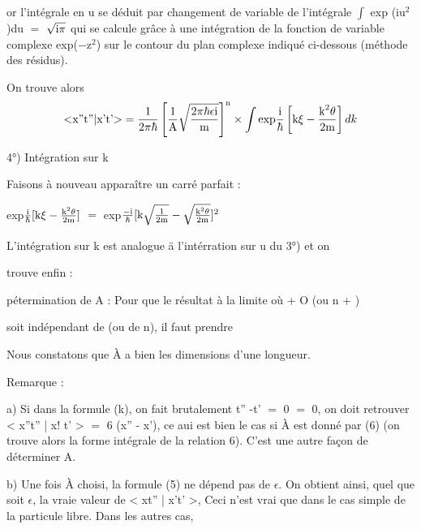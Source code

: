 or l'intégrale en u se déduit par changement de variable de
l'intégrale $\int$ exp (iu$^2$)du $=$ $\sqrt{\text{i}\pi}$ qui se calcule grâce à une intégration
de la fonction de variable complexe exp($-$z$^2$) sur le contour du plan complexe
indiqué ci-dessous (méthode des résidus).
\begin{center}
\end{center}
On trouve alors
\[
\text{<x''t''|x't'>} = \frac{1}{2\pi\hbar} \left[ \frac{1}{\text{A}}
\sqrt{\frac{2\pi\hbar\epsilon\text{i}}{\text{m}}} \right]^{\text{n}}
\times \int \text{exp} \frac{\text{i}}{\hbar}\left[\text{k}\xi-\frac{\text{k}^2\theta}{2\text{m}}\right]dk 
\]

4°) Intégration sur k

Faisons à nouveau apparaître un carré parfait :
\begin{center}
exp$\frac{\text{i}}{\hbar}[\text{k}\xi-\frac{\text{k}^2\theta}{2\text{m}}]$ $=$
exp$\frac{-\text{i}}{\hbar}[\text{k}\sqrt{\frac{1}{2\text{m}}}-\sqrt{\frac{\text{k}^2\theta}{2\text{m}}}]^2$
\end{center}

L'intégration sur k est analogue ä l'intérration sur u du 3°) et on

trouve enfin :

pétermination de A : Pour que le résultat à la limite où  + O (ou n + )

soit indépendant de  (ou de n), il faut prendre

Nous constatons que À a bien les dimensions d'une longueur.

 
Remarque :

a) Si dans la formule (k), on fait brutalement t'' -t' $=$ 0 $=$ 0, on doit
retrouver < x''t'' | x! t' > $=$ 6 (x'' - x'), ce aui est bien le cas si À est
donné par (6) (on trouve alors la forme intégrale de la relation 6). C'est
une autre façon de déterminer A.

b) Une fois À choisi, la formule (5) ne dépend pas de $\epsilon$. On obtient ainsi,
quel que soit $\epsilon$, la vraie valeur de < xt'' | x't' >, Ceci n'est vrai que
dans le cas simple de la particule libre. Dans les autres cas,

